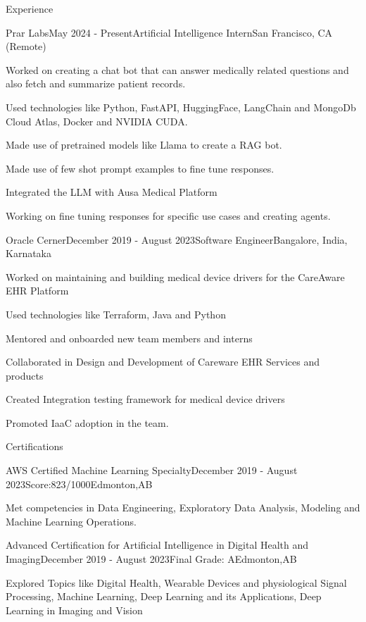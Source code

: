 \documentclass[
	10pt, %
]{resume} %
\begin{document}
\begin{rSection}{Experience}

	\begin{rSubsection}{Prar Labs}{May 2024 - Present}{Artificial Intelligence Intern}{San Francisco, CA (Remote)}
		\item Worked on creating a chat bot that can answer medically related questions and also fetch and summarize patient records.
		\item Used technologies like Python, FastAPI, HuggingFace, LangChain and MongoDb Cloud Atlas, Docker and NVIDIA CUDA.
		\item Made use of pretrained models like Llama to create a RAG bot.
		\item Made use of few shot prompt examples to fine tune responses.
		\item Integrated the LLM with Ausa Medical Platform
		\item Working on fine tuning responses for specific use cases and creating agents.
	\end{rSubsection}


	\begin{rSubsection}{Oracle Cerner}{December 2019 - August 2023}{Software Engineer}{Bangalore, India, Karnataka}
		\item Worked on maintaining and building medical device drivers for the CareAware EHR Platform
		\item Used technologies like Terraform, Java and Python
		\item Mentored and onboarded new team members and interns
		\item Collaborated in Design and Development of Careware EHR Services and products
		\item Created Integration testing framework for medical device drivers
		\item Promoted IaaC adoption in the team.
	\end{rSubsection}
	
\end{rSection}

\begin{rSection}{Certifications}
	\begin{rSubsection}{AWS Certified Machine Learning Specialty}{December 2019 - August 2023}{Score:823/1000}{Edmonton,AB}
		\item Met competencies in Data Engineering, Exploratory Data Analysis, Modeling and Machine Learning Operations.
	\end{rSubsection}
	\begin{rSubsection}{Advanced Certification for Artificial Intelligence in Digital Health and Imaging}{December 2019 - August 2023}{Final Grade: A}{Edmonton,AB}
		\item Explored Topics like Digital Health, Wearable Devices and physiological Signal Processing, Machine Learning, Deep Learning and its Applications, Deep Learning in Imaging and Vision
	\end{rSubsection}
\end{rSection}
\end{document}

